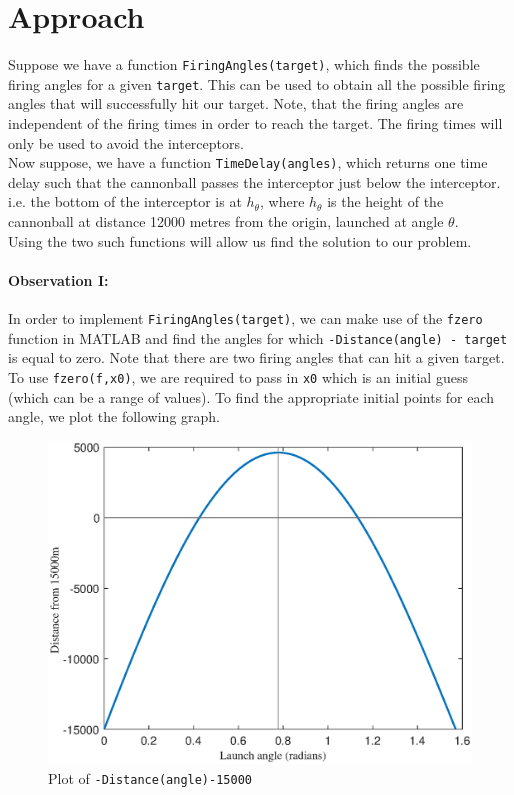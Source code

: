 \documentclass[11pt]{report}
\begin{document}
\section{Approach}
Suppose we have a function \texttt{FiringAngles(target)}, which finds the possible firing angles for a given \texttt{target}. This can be used to obtain all the possible firing angles that will successfully hit our target. Note, that the firing angles are independent of the firing times in order to reach the target. The firing times will only be used to avoid the interceptors. \\

Now suppose, we have a function \texttt{TimeDelay(angles)}, which returns one time delay such that the cannonball passes the interceptor just below the interceptor. i.e. the bottom of the interceptor is at $h_{\theta}$, where $h_{\theta}$ is the height of the cannonball at distance 12000 metres from the origin, launched at angle $\theta$. \\

Using the two such functions will allow us find the solution to our problem.

%

\paragraph{Observation I:}
In order to implement \texttt{FiringAngles(target)}, we can make use of the \texttt{fzero} function in MATLAB and find the angles for which \texttt{-Distance(angle) - target} is equal to zero. Note that there are two firing angles that can hit a given target. To use \texttt{fzero(f,x0)}, we are required to pass in \texttt{x0} which is an initial guess (which can be a range of values). To find the appropriate initial points for each angle, we plot the following graph.

 \begin{figure}[h]
	\centering
  	\includegraphics[scale=0.5]{assets/fzero_theta.eps}
  	\caption{Plot of \texttt{-Distance(angle)-15000}}
  	\label{fig:fzero}
\end{figure}
\end{document}
